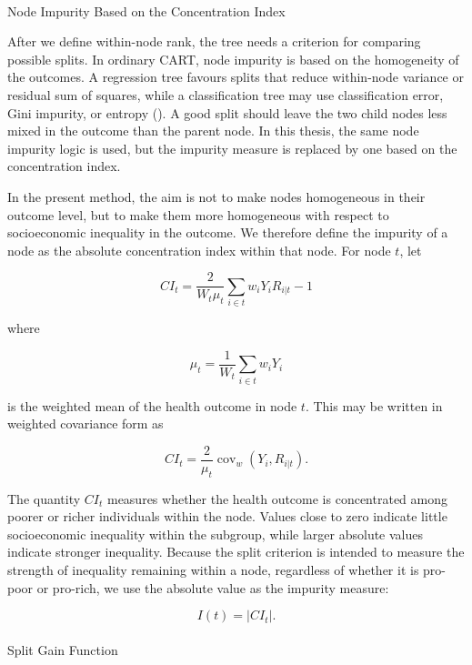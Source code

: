 \documentclass[
  11pt,
  a4paper,
]{article}
\makeatletter
\let\oldparagraph\paragraph
\renewcommand{\paragraph}{
    \@ifstar
      \xxxParagraphStar
      \xxxParagraphNoStar
  }
\newcommand{\xxxParagraphStar}[1]{\oldparagraph*{#1}\mbox{}}
\newcommand{\xxxParagraphNoStar}[1]{\oldparagraph{#1}\mbox{}}
\makeatother
\begin{document}
\paragraph{Node Impurity Based on the Concentration
Index}\label{sec-node-impurity-ci}

After we define within-node rank, the tree needs a criterion for
comparing possible splits. In ordinary CART, node impurity is based on
the homogeneity of the outcomes. A regression tree favours splits that
reduce within-node variance or residual sum of squares, while a
classification tree may use classification error, Gini impurity, or
entropy (). A good split should leave the two child nodes less
mixed in the outcome than the parent node. In this thesis, the same node
impurity logic is used, but the impurity measure is replaced by one
based on the concentration index.

In the present method, the aim is not to make nodes homogeneous in their
outcome level, but to make them more homogeneous with respect to
socioeconomic inequality in the outcome. We therefore define the
impurity of a node as the absolute concentration index within that node.
For node \(t\), let

\[
CI_t = \frac{2}{W_t \mu_t} \sum_{i \in t} w_i Y_i R_{i|t} - 1
\]

where

\[
\mu_t = \frac{1}{W_t}\sum_{i \in t} w_i Y_i
\]

is the weighted mean of the health outcome in node \(t\). This may be
written in weighted covariance form as

\[
CI_t = \frac{2}{\mu_t}\operatorname{cov}_w(Y_i, R_{i|t}).
\]

The quantity \(CI_t\) measures whether the health outcome is
concentrated among poorer or richer individuals within the node. Values
close to zero indicate little socioeconomic inequality within the
subgroup, while larger absolute values indicate stronger inequality.
Because the split criterion is intended to measure the strength of
inequality remaining within a node, regardless of whether it is pro-poor
or pro-rich, we use the absolute value as the impurity measure:

\[
I(t) = |CI_t|.
\]

\paragraph{Split Gain Function}\label{sec-split-gain}
\end{document}
